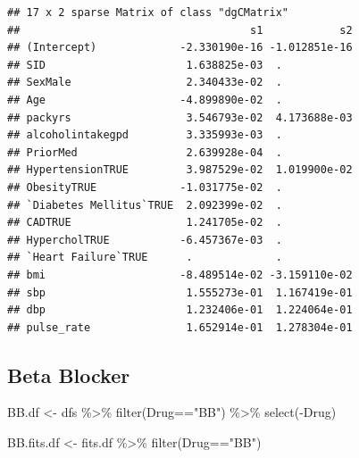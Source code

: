 \documentclass[
]{article}
\newenvironment{Shaded}{\begin{snugshade}}{\end{snugshade}}
\newcommand{\FloatTok}[1]{\textcolor[rgb]{0.00,0.00,0.81}{#1}}
\newcommand{\FunctionTok}[1]{\textcolor[rgb]{0.00,0.00,0.00}{#1}}
\newcommand{\NormalTok}[1]{#1}
\newcommand{\OtherTok}[1]{\textcolor[rgb]{0.56,0.35,0.01}{#1}}
\newcommand{\SpecialCharTok}[1]{\textcolor[rgb]{0.00,0.00,0.00}{#1}}
\newcommand{\StringTok}[1]{\textcolor[rgb]{0.31,0.60,0.02}{#1}}
\begin{document}
\begin{Shaded}
\end{Shaded}

\begin{verbatim}
## 17 x 2 sparse Matrix of class "dgCMatrix"
##                                    s1            s2
## (Intercept)             -2.330190e-16 -1.012851e-16
## SID                      1.638825e-03  .           
## SexMale                  2.340433e-02  .           
## Age                     -4.899890e-02  .           
## packyrs                  3.546793e-02  4.173688e-03
## alcoholintakegpd         3.335993e-03  .           
## PriorMed                 2.639928e-04  .           
## HypertensionTRUE         3.987529e-02  1.019900e-02
## ObesityTRUE             -1.031775e-02  .           
## `Diabetes Mellitus`TRUE  2.092399e-02  .           
## CADTRUE                  1.241705e-02  .           
## HypercholTRUE           -6.457367e-03  .           
## `Heart Failure`TRUE      .             .           
## bmi                     -8.489514e-02 -3.159110e-02
## sbp                      1.555273e-01  1.167419e-01
## dbp                      1.232406e-01  1.224064e-01
## pulse_rate               1.652914e-01  1.278304e-01
\end{verbatim}

\hypertarget{beta-blocker}{%
\subsection{Beta Blocker}\label{beta-blocker}}

\begin{Shaded}
\begin{Highlighting}[]
\NormalTok{BB.df }\OtherTok{\textless{}{-}}\NormalTok{ dfs }\SpecialCharTok{\%\textgreater{}\%} 
  \FunctionTok{filter}\NormalTok{(Drug}\SpecialCharTok{==}\StringTok{"BB"}\NormalTok{) }\SpecialCharTok{\%\textgreater{}\%} 
  \FunctionTok{select}\NormalTok{(}\SpecialCharTok{{-}}\NormalTok{Drug)}
\end{Highlighting}
\end{Shaded}

\begin{Shaded}
\begin{Highlighting}[]
\NormalTok{BB.fits.df }\OtherTok{\textless{}{-}}\NormalTok{ fits.df }\SpecialCharTok{\%\textgreater{}\%} 
  \FunctionTok{filter}\NormalTok{(Drug}\SpecialCharTok{==}\StringTok{"BB"}\NormalTok{)}
\end{Highlighting}
\end{Shaded}
\end{document}

